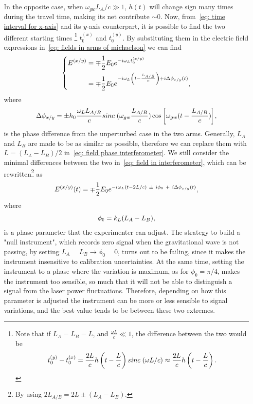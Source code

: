 In the opposite case, when $\omega_{gw}L_A/c \gg 1$, $h(t)$ will change sign many times during the travel time, making its net contribute $\sim0$.
Now, from~\eqref{eq: time interval for x-axis} and its $y$-axis counterpart, it is possible to find the two different starting times
\footnote{Note that if $L_A=L_B=L$, and $\frac{\omega L}{c}\ll 1$, the difference between the two would be
\[
    t_0^{(y)} - t_0^{(x)} = \frac{2L}{c} h\left(t-\frac{L}{c}\right)sinc\hspace{1mm}(\omega L/c)\approx \frac{2L}{c}h\left(t-\frac{L}{c}\right).
\]
}
$t_0^{(x)}$ and $t_0^{(y)}$. 
By substituting them in the electric field expressions in~\eqref{eq: fields in arms of michaelson} we can find
\begin{equation}
    \left\{
        \begin{aligned}
            E^{(x/y)} &= \mp\frac{1}{2}E_0e^{-i\omega_L t_0^{(x/y)}} \\
            \vspace{1mm}
                      &= \mp\frac{1}{2}E_0e^{-i\omega_L \left(t-\frac{L_{A/B}}{c}\right)+i\Delta\phi_{x/y}(t)},
        \end{aligned}
    \right.
    \label{eq: field in interferometer}
\end{equation}
where
\begin{equation}
    \Delta\phi_{x/y}= \pm h_0 \frac{\omega_L L_{A/B}}{c} sinc\hspace{1mm}(\omega_{gw}\frac{L_{A/B}}{c})\cos{\left[ \omega_{gw}(t - \frac{L_{A/B}}{c}) \right]},
    \label{eq: field phase interferometer}
\end{equation}
is the phase difference from the unperturbed case in the two arms.
Generally, $L_A$ and $L_B$ are made to be as similar as possible, therefore we can replace them with $L=(L_A - L_B)/2$ in~\eqref{eq: field phase interferometer}. 
We still consider the minimal differences between the two in~\eqref{eq: field in interferometer}, which can be rewritten\footnote{By using $2L_{A/B} = 2L \pm (L_A - L_B)$.} as 
\begin{equation*}
    E^{(x/y)}(t) = \mp \frac{1}{2}E_0 e^{-i\omega_L(t-2L/c)~\pm~i\phi_0~+~i\Delta\phi_{x/y}(t)},
    \notag
\end{equation*}
where
\begin{equation}
    \phi_0 = k_L(L_A - L_B),
    \notag
\end{equation}
is a phase parameter that the experimenter can adjust.
The strategy to build a "null instrument", which records zero signal when the gravitational wave is not passing, by setting $L_A = L_B \to \phi_0=0$, turns out to be failing, since it makes the instrument insensitive to calibration uncertainties.
At the same time, setting the instrument to a phase where the variation is maximum, as for $\phi_0=\pi/4$, makes the instrument too sensible, so much that it will not be able to distinguish a signal from the laser power fluctuations.
Therefore, depending on how this parameter is adjusted the instrument can be more or less sensible to signal variations, and the best value tends to be between these two extremes.

